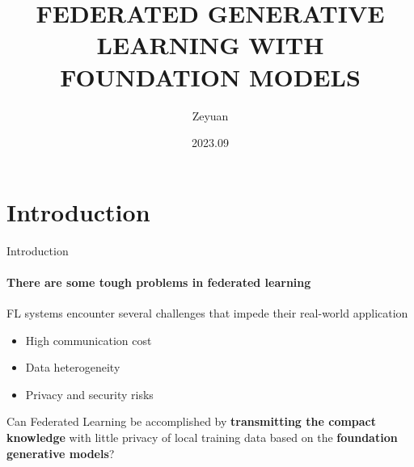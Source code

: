 \documentclass{beamer}
\title{FEDERATED GENERATIVE LEARNING WITH FOUNDATION MODELS}
\author{Zeyuan}
\date{2023.09}
\begin{document}
\maketitle


\section{Introduction}

\begin{frame}{Introduction}
\framesubtitle{There are some tough problems in federated learning}
	FL systems encounter several challenges that impede their real-world application
\begin{itemize}
	
\item High communication cost
\item Data heterogeneity
\item Privacy and security risks
\end{itemize}
\begin{block}{}
Can Federated Learning be accomplished by \textbf{transmitting the compact knowledge} with little privacy
of local training data based on the \textbf{foundation generative models}?
\end{block}
\end{frame}
\end{document}
